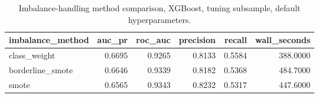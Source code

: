 \begin{table}
\caption{Imbalance-handling method comparison, XGBoost, tuning subsample, default hyperparameters.}
\label{tab:table15_imbalance_method_comparison}
\begin{tabular}{lrrrrr}
\toprule
imbalance\_method & auc\_pr & roc\_auc & precision & recall & wall\_seconds \\
\midrule
class\_weight & 0.6695 & 0.9265 & 0.8133 & 0.5584 & 388.0000 \\
borderline\_smote & 0.6646 & 0.9339 & 0.8182 & 0.5368 & 484.7000 \\
smote & 0.6565 & 0.9343 & 0.8232 & 0.5317 & 447.6000 \\
\bottomrule
\end{tabular}
\end{table}
